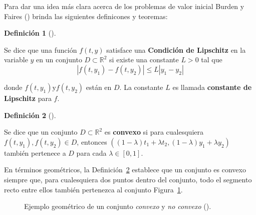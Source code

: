 \documentclass[
  spanish,
  us-letterpaper,
  DIV=11,
  numbers=noendperiod]{scrreprt}
\theoremstyle{plain}
\theoremstyle{definition}
\newtheorem{definition}{Definición}[chapter]
\theoremstyle{remark}
\begin{document}
Para dar una idea más clara acerca de los problemas de valor inicial
Burden y Faires () brinda las siguientes
definicones y teoremas:

\begin{definition}[]\protect\hypertarget{def-Lip-con}{}\label{def-Lip-con}

Se dice que una función \(f(t,y)\) satisface una \textbf{Condición de
Lipschitz} en la variable \(y\) en un conjunto
\(D \subset \mathbb{R}^2\) si existe una constante \(L>0\) tal que \[
|f(t,y_1) - f(t,y_2)| \leq L|y_1-y_2|
\]

donde \(f(t,y_1) \text{y} f(t,y_2)\) están en \(D\). La constante \(L\)
es llamada \textbf{constante de Lipschitz} para \(f\).

\end{definition}

\begin{definition}[]\protect\hypertarget{def-convex-set}{}\label{def-convex-set}

Se dice que un conjunto \(D \subset \mathbb{R}^2\) es \textbf{convexo}
si para cualesquiera \(f(t,y_1), f(t,y_2) \in D\), entonces
\(((1-\lambda)t_1 + \lambda t_2, (1-\lambda)y_1 + \lambda y_2)\) también
pertenece a \(D\) para cada \(\lambda \in[0,1]\).

\end{definition}

En términos geométricos, la Definición~\ref{def-convex-set} establece
que un conjunto es convexo siempre que, para cualesquiera dos puntos
dentro del conjunto, todo el segmento recto entre ellos también
pertenezca al conjunto Figura~\ref{fig-convx-set}.

\begin{figure}


\caption{\label{fig-convx-set}Ejemplo geométrico de un conjunto
\emph{convexo} y \emph{no convexo} ().}

\end{figure}%
\end{document}
